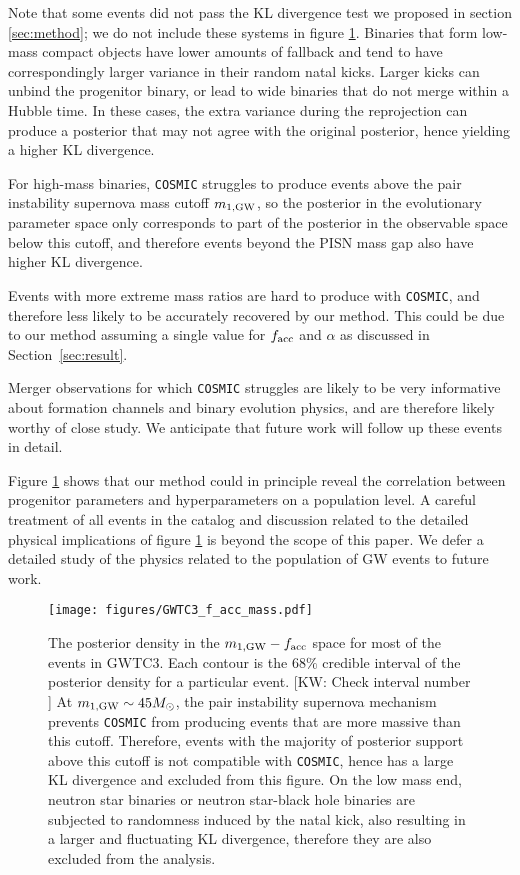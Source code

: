 \documentclass[twocolumn]{aastex631}
\newcommand{\kw}[1]{{\color{rb4}[KW: #1 ]}}
\begin{document}
Note that some events did not pass the KL divergence test we proposed in section
\ref{sec:method}; we do not include these systems in figure
\ref{fig:GWTC3_f_acc_mass}. Binaries that form low-mass compact objects have
lower amounts of fallback and tend to have correspondingly larger variance in
their random natal kicks. Larger kicks can unbind the progenitor binary, or lead
to wide binaries that do not merge within a Hubble time.  In these cases, the
extra variance during the reprojection can produce a posterior that may not
agree with the original posterior, hence yielding a higher KL divergence. 

For high-mass binaries, \texttt{COSMIC} struggles to produce events above the
pair instability supernova mass cutoff $m_{1,{\rm GW}}$, so the posterior in the
evolutionary parameter space only corresponds to part of the posterior in the
observable space below this cutoff, and therefore events beyond the PISN mass
gap also have higher KL divergence. 

Events with more extreme mass ratios are hard to produce with \texttt{COSMIC},
and therefore less likely to be accurately recovered by our method. This could
be due to our method assuming a single value for $f_{\rm acc}$ and $\alpha$ as
discussed in Section~\ref{sec:result}.

Merger observations for which \texttt{COSMIC} struggles are likely to be very
informative about formation channels and binary evolution physics, and are
therefore likely worthy of close study.  We anticipate that future work will
follow up these events in detail.

Figure \ref{fig:GWTC3_f_acc_mass} shows that our method could in principle
reveal the correlation between progenitor parameters and hyperparameters on a
population level. A careful treatment of all events in the catalog and
discussion related to the detailed physical implications of figure
\ref{fig:GWTC3_f_acc_mass} is beyond the scope of this paper.  We defer a
detailed study of the physics related to the population of GW events to future
work. 


\begin{figure}
\texttt{[image: figures/GWTC3\_f\_acc\_mass.pdf]}
\caption{
    The posterior density in the $m_{1,{\rm GW}}-f_{\rm acc}$ space for most of the events in GWTC3.
    Each contour is the $68\%$ credible interval of the posterior density for a particular event. \kw{Check interval number}
    At $m_{1,{\rm GW}} \sim 45 M_{\odot}$, the pair instability supernova mechanism prevents \texttt{COSMIC} from producing events that are more massive than this cutoff.
    Therefore, events with the majority of posterior support above this cutoff is not compatible with \texttt{COSMIC}, hence has a large KL divergence and excluded from this figure.
    On the low mass end, neutron star binaries or neutron star-black hole binaries are subjected to randomness induced by the natal kick,
    also resulting in a larger and fluctuating KL divergence, therefore they are also excluded from the analysis.
}
\label{fig:GWTC3_f_acc_mass}
\end{figure}
\end{document}
